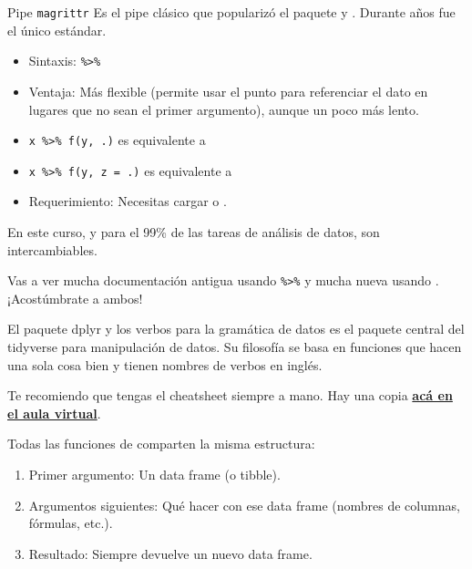 \documentclass[8pt]{beamer}
\begin{document}
\begin{frame}[fragile]{Pipe \texttt{magrittr}}
	Es el pipe clásico que popularizó el paquete  y . Durante años fue el único estándar.

	
	\begin{itemize}
		\item Sintaxis: \lstinline[style=RScript, basicstyle = \normalfont]`%>%`
		\item Ventaja: Más flexible (permite usar el punto  para referenciar el dato en lugares que no sean el primer argumento), aunque un poco más lento.
		\item \lstinline[style=RScript, basicstyle = \normalfont]`x %>% f(y, .)` es equivalente a 
		\item \lstinline[style=RScript, basicstyle = \normalfont]`x %>% f(y, z = .)` es equivalente a 
		\item Requerimiento: Necesitas cargar  o .
	\end{itemize}
	
	En este curso, y para el 99\% de las tareas de análisis de datos, son intercambiables. 
	
	Vas a ver mucha documentación antigua usando \lstinline[style=RScript, basicstyle = \normalfont]`%>%` y mucha nueva usando \rscript{|>}. ¡Acostúmbrate a ambos!
\end{frame}







\begin{frame}[fragile]{El paquete dplyr y los verbos para la gramática de datos}
	 es el paquete central del tidyverse para manipulación de datos. Su filosofía se basa en funciones que hacen una sola cosa bien y tienen nombres de verbos en inglés.
	
	Te recomiendo que tengas el cheatsheet siempre a mano. Hay una copia \href{https://servicios.unl.edu.ar/aulavirtual/fce/mod/resource/view.php?id=67152&redirect=1}{\textbf{ac\'a en el aula virtual}}.
	
	Todas las funciones de  comparten la misma estructura:
	\begin{enumerate}
		\item Primer argumento: Un data frame (o tibble).
		\item Argumentos siguientes: Qué hacer con ese data frame (nombres de columnas, fórmulas, etc.).
		\item Resultado: Siempre devuelve un nuevo data frame.
	\end{enumerate}
\end{frame}
\end{document}
